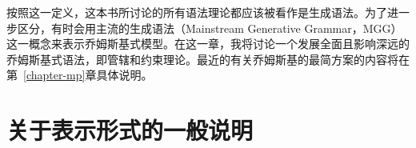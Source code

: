 按照这一定义，这本书所讨论的所有语法理论都应该被看作是生成语法。为了进一步区分，有时会用主流的生成语法（Mainstream Generative Grammar，MGG）这一概念\citep[]{CJ2005a}来表示乔姆斯基式模型。在这一章，我将讨论一个发展全面且影响深远的乔姆斯基式语法，即管辖和约束理论。最近的有关乔姆斯基的最简方案的内容将在第~\ref{chapter-mp}章具体说明。

\section{关于表示形式的一般说明}
\label{Abschnitt-GB-allgemein}


